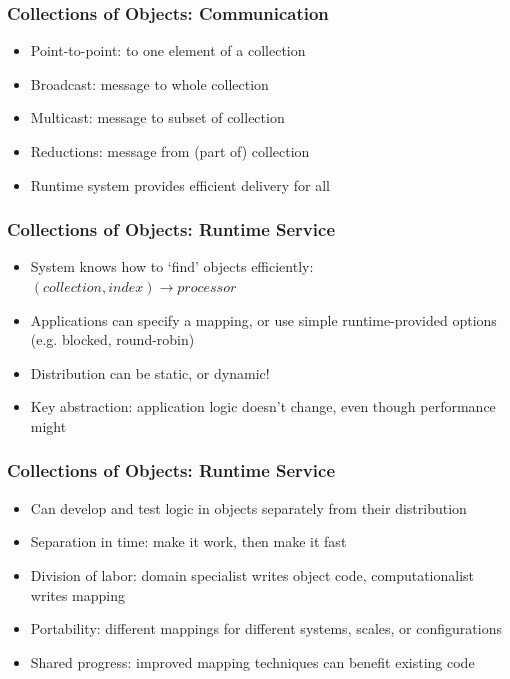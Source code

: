 \begin{frame}[fragile]
  \frametitle{Collections of Objects: Communication}
  \begin{itemize}
    \item Point-to-point: to one element of a collection
    \item Broadcast: message to whole collection
    \item Multicast: message to subset of collection
    \item Reductions: message from (part of) collection
    \item Runtime system provides efficient delivery for all
  \end{itemize}
\end{frame}

\begin{frame}[fragile]
  \frametitle{Collections of Objects: Runtime Service}
  \begin{itemize}
    \item System knows how to `find' objects efficiently: $(collection, index) \to processor$
    \item Applications can specify a mapping, or use simple
      runtime-provided options (e.g. blocked, round-robin)
    \item Distribution can be static, or dynamic!
    \item Key abstraction: application logic doesn't change, even
      though performance might
  \end{itemize}
\end{frame}

\begin{frame}[fragile]
  \frametitle{Collections of Objects: Runtime Service}
  \begin{itemize}
    \item Can develop and test logic in objects separately from their distribution
    \item Separation in time: make it work, then make it fast
    \item Division of labor: domain specialist writes object code, computationalist writes mapping
    \item Portability: different mappings for different systems, scales, or configurations
    \item Shared progress: improved mapping techniques can benefit existing code
  \end{itemize}
\end{frame}

